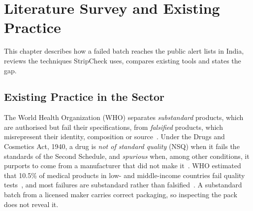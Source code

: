 \chapter{Literature Survey and Existing Practice}
\label{ch:lit}

This chapter describes how a failed batch reaches the public alert lists in India, reviews the techniques StripCheck uses, compares existing tools and states the gap.

\section{Existing Practice in the Sector}
\label{sec:lit-existing-practice-in-the-sector}

The World Health Organization (WHO) separates \emph{substandard} products, which are authorised but fail their specifications, from \emph{falsified} products, which misrepresent their identity, composition or source~\cite{who2017definitions}. Under the Drugs and Cosmetics Act, 1940, a drug is \emph{not of standard quality} (NSQ) when it fails the standards of the Second Schedule, and \emph{spurious} when, among other conditions, it purports to come from a manufacturer that did not make it~\cite{dcact1940s17b}. WHO estimated that 10.5\% of medical products in low- and middle-income countries fail quality tests~\cite{who2017oneinten}, and most failures are substandard rather than falsified~\cite{ozawa2022characterizing}. A substandard batch from a licensed maker carries correct packaging, so inspecting the pack does not reveal it.

